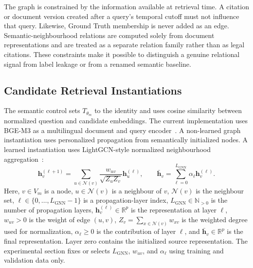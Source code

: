 \documentclass[runningheads]{llncs}
\begin{document}
The graph is constrained by the information available at retrieval time. A citation or document version created after a query's temporal cutoff must not influence that query. Likewise, Ground Truth membership is never added as an edge. Semantic-neighbourhood relations are computed solely from document representations and are treated as a separate relation family rather than as legal citations. These constraints make it possible to distinguish a genuine relational signal from label leakage or from a renamed semantic baseline.

\subsection{Candidate Retrieval Instantiations}

The semantic control sets \(T_{\theta_m}\) to the identity and uses cosine similarity between normalized question and candidate embeddings. The current implementation uses BGE-M3 as a multilingual document and query encoder~\cite{chen2024bgem3}. A non-learned graph instantiation uses personalized propagation from semantically initialized nodes. A learned instantiation uses LightGCN-style normalized neighbourhood aggregation~\cite{he2020lightgcn}:
\begin{equation}
  \mathbf{h}_v^{(\ell+1)}=
  \sum_{u\in\mathcal{N}(v)}
  \frac{w_{uv}}{\sqrt{Z_u Z_v}}\mathbf{h}_u^{(\ell)},
  \qquad
  \bar{\mathbf{h}}_v=\sum_{\ell=0}^{L_{\mathrm{GNN}}}\alpha_\ell\mathbf{h}_v^{(\ell)}.
  \label{eq:lightgcn}
\end{equation}
Here, \(v\in V_m\) is a node, \(u\in\mathcal{N}(v)\) is a neighbour of \(v\), \(\mathcal{N}(v)\) is the neighbour set, \(\ell\in\{0,\ldots,L_{\mathrm{GNN}}-1\}\) is a propagation-layer index, \(L_{\mathrm{GNN}}\in\mathbb{N}_{>0}\) is the number of propagation layers, \(\mathbf{h}_v^{(\ell)}\in\mathbb{R}^{p}\) is the representation at layer \(\ell\), \(w_{uv}>0\) is the weight of edge \((u,v)\), \(Z_v=\sum_{x\in\mathcal{N}(v)}w_{xv}\) is the weighted degree used for normalization, \(\alpha_\ell\geq0\) is the contribution of layer \(\ell\), and \(\bar{\mathbf{h}}_v\in\mathbb{R}^{p}\) is the final representation. Layer zero contains the initialized source representation. The experimental section fixes or selects \(L_{\mathrm{GNN}}\), \(w_{uv}\), and \(\alpha_\ell\) using training and validation data only.
\end{document}
